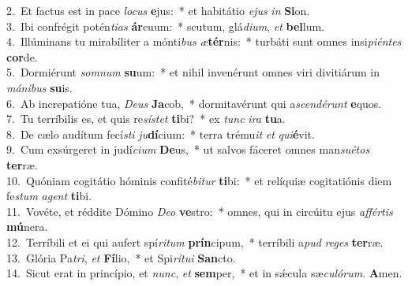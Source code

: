 {2.~}Et factus est in pace \textit{lo}\textit{cus} \textbf{e}jus:~* et habitátio \textit{e}\textit{jus} \textit{in} \textbf{Si}on.\\
{3.~}Ibi confrégit potén\textit{ti}\textit{as} \textbf{ár}cuum:~* scutum, glá\textit{di}\textit{um}, \textit{et} \textbf{bel}lum.\\
{4.~}Illúminans tu mirabíliter a mónti\textit{bus} \textit{æ}\textbf{tér}nis:~* turbáti sunt omnes insi\textit{pi}\textit{én}\textit{tes} \textbf{cor}de.\\
{5.~}Dormiérunt \textit{som}\textit{num} \textbf{su}um:~* et nihil invenérunt omnes viri divitiárum in \textit{má}\textit{ni}\textit{bus} \textbf{su}is.\\
{6.~}Ab increpatióne tua, \textit{De}\textit{us} \textbf{Ja}cob,~* dormitavérunt qui a\textit{scen}\textit{dé}\textit{runt} \textbf{e}quos.\\
{7.~}Tu terríbilis es, et quis re\textit{sí}\textit{stet} \textbf{ti}bi?~* ex \textit{tunc} \textit{i}\textit{ra} \textbf{tu}a.\\
{8.~}De cælo audítum fecí\textit{sti} \textit{ju}\textbf{dí}cium:~* terra trému\textit{it} \textit{et} \textit{qui}\textbf{é}vit.\\
{9.~}Cum exsúrgeret in judí\textit{ci}\textit{um} \textbf{De}us,~* ut salvos fáceret omnes man\textit{su}\textit{é}\textit{tos} \textbf{ter}ræ.\\
{10.~}Quóniam cogitátio hóminis confité\textit{bi}\textit{tur} \textbf{ti}bi:~* et relíquiæ cogitatiónis diem fe\textit{stum} \textit{a}\textit{gent} \textbf{ti}bi.\\
{11.~}Vovéte, et réddite Dómino \textit{De}\textit{o} \textbf{ve}stro:~* omnes, qui in circúitu ejus \textit{af}\textit{fér}\textit{tis} \textbf{mú}nera.\\
{12.~}Terríbili et ei qui aufert spí\textit{ri}\textit{tum} \textbf{prín}cipum,~* terríbili a\textit{pud} \textit{re}\textit{ges} \textbf{ter}ræ.\\
{13.~}Glória Pa\textit{tri}, \textit{et} \textbf{Fí}lio,~* et Spi\textit{rí}\textit{tu}\textit{i} \textbf{San}cto.\\
{14.~}Sicut erat in princípio, et \textit{nunc}, \textit{et} \textbf{sem}per,~* et in sǽcula sæ\textit{cu}\textit{ló}\textit{rum}. \textbf{A}men.\\
